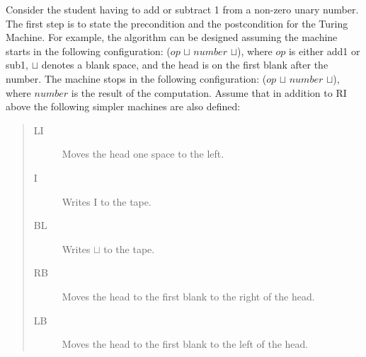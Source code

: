 \documentclass{eptcs}
\begin{document}
Consider the student having to add or subtract 1 from a non-zero unary number. The first step is to state the precondition and the postcondition for the Turing Machine. For example, the algorithm can be designed assuming the machine starts in the following configuration: ($\mathit{op}$ $\sqcup$ $number$ \underline{$\sqcup$}), where $\mathit{op}$ is either \textsf{add1} or \textsf{sub1}, $\sqcup$ denotes a blank space, and the head is on the first blank after the number. The machine stops in the following configuration: ($\mathit{op}$ $\sqcup$ $number$ \underline{$\sqcup$}), where $number$ is the result of the computation. Assume that in addition to \textsf{RI} above the following simpler machines are also defined:
\begin{quote}
\begin{description}
  \item [LI] Moves the head one space to the left.
  \item [I] Writes I to the tape.
  \item [BL] Writes $\sqcup$ to the tape.
  \item [RB] Moves the head to the first blank to the right of the head.
  \item [LB] Moves the head to the first blank to the left of the head.
\end{description}
\end{quote}
\end{document}
